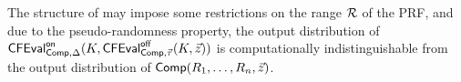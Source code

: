 The structure of \Comp may impose some restrictions on the range $\mathcal{R}$ of the
PRF, and due to the pseudo-randomness property, the output distribution of
$\CFEval^\on_{\Comp, \Delta}(K, \CFEval^\off_{\Comp, \vec{\tau}}(K, \vec{z}))$
is computationally indistinguishable from the output distribution of
$\Comp(R_1, \dotsc, R_n, \vec{z})$.

